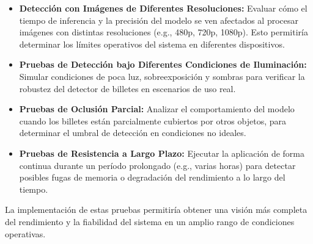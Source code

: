 \begin{itemize}
    \item \textbf{Detección con Imágenes de Diferentes Resoluciones:} Evaluar cómo el tiempo de inferencia y la precisión del modelo se ven afectados al procesar imágenes con distintas resoluciones (e.g., 480p, 720p, 1080p). Esto permitiría determinar los límites operativos del sistema en diferentes dispositivos.
    \item \textbf{Pruebas de Detección bajo Diferentes Condiciones de Iluminación:} Simular condiciones de poca luz, sobreexposición y sombras para verificar la robustez del detector de billetes en escenarios de uso real.
    \item \textbf{Pruebas de Oclusión Parcial:} Analizar el comportamiento del modelo cuando los billetes están parcialmente cubiertos por otros objetos, para determinar el umbral de detección en condiciones no ideales.
    \item \textbf{Pruebas de Resistencia a Largo Plazo:} Ejecutar la aplicación de forma continua durante un período prolongado (e.g., varias horas) para detectar posibles fugas de memoria o degradación del rendimiento a lo largo del tiempo.
\end{itemize}

La implementación de estas pruebas permitiría obtener una visión más completa del rendimiento y la fiabilidad del sistema en un amplio rango de condiciones operativas.